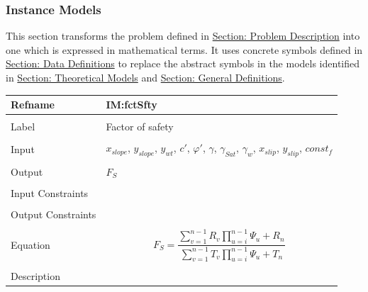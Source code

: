 \documentclass[12pt]{article}
\begin{document}
\subsubsection{Instance Models}
\label{Sec:IMs}
This section transforms the problem defined in \hyperref[Sec:ProbDesc]{Section: Problem Description} into one which is expressed in mathematical terms. It uses concrete symbols defined in \hyperref[Sec:DDs]{Section: Data Definitions} to replace the abstract symbols in the models identified in \hyperref[Sec:TMs]{Section: Theoretical Models} and \hyperref[Sec:GDs]{Section: General Definitions}.
~\newline
 \noindent \begin{minipage}{\textwidth}
\begin{tabular}{p{} p{}}
\toprule \textbf{Refname} & \textbf{IM:fctSfty}
\label{IM:fctSfty}
\\ \midrule \\
Label & Factor of safety
        \\ \midrule \\
        Input & ${x_{slope}}$, ${y_{slope}}$, ${y_{wt}}$, $c'$, $φ'$, $γ$, ${γ_{Sat}}$, ${γ_{w}}$, ${x_{slip}}$, ${y_{slip}}$, $const_f$
                \\ \midrule \\
                Output & ${F_{S}}$
                         \\ \midrule \\
                         Input Constraints & \\ \midrule \\
                                             Output Constraints & \\ \midrule \\
                                                                  Equation & \begin{dmath}
                                                                             {F_{S}}=\frac{\displaystyle\sum_{v=1}^{n-1}{R_{v} \displaystyle\prod_{u=i}^{n-1}{Ψ_{u}}}+R_{n}}{\displaystyle\sum_{v=1}^{n-1}{T_{v} \displaystyle\prod_{u=i}^{n-1}{Ψ_{u}}}+T_{n}}
                                                                             \end{dmath}
                                                                             \\ \midrule \\
                                                                             Description & \begin{symbDescription}

\end{symbDescription}
\end{tabular}
\end{minipage}
\end{document}
